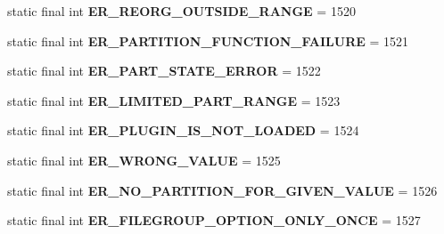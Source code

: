 \begin{DoxyCompactItemize}
static final int {\bfseries E\+R\+\_\+\+R\+E\+O\+R\+G\+\_\+\+O\+U\+T\+S\+I\+D\+E\+\_\+\+R\+A\+N\+GE} = 1520
\item 
\mbox{\label{classcom_1_1mysql_1_1jdbc_1_1_mysql_error_numbers_acfb68e0818bd6c25bb9a5c23c0c34066}} 
static final int {\bfseries E\+R\+\_\+\+P\+A\+R\+T\+I\+T\+I\+O\+N\+\_\+\+F\+U\+N\+C\+T\+I\+O\+N\+\_\+\+F\+A\+I\+L\+U\+RE} = 1521
\item 
\mbox{\label{classcom_1_1mysql_1_1jdbc_1_1_mysql_error_numbers_a9e58d22005489ba94e829c7f9d4f4b8c}} 
static final int {\bfseries E\+R\+\_\+\+P\+A\+R\+T\+\_\+\+S\+T\+A\+T\+E\+\_\+\+E\+R\+R\+OR} = 1522
\item 
\mbox{\label{classcom_1_1mysql_1_1jdbc_1_1_mysql_error_numbers_a5b07e19e49c57a0c1a8d88fe60d5ea9e}} 
static final int {\bfseries E\+R\+\_\+\+L\+I\+M\+I\+T\+E\+D\+\_\+\+P\+A\+R\+T\+\_\+\+R\+A\+N\+GE} = 1523
\item 
\mbox{\label{classcom_1_1mysql_1_1jdbc_1_1_mysql_error_numbers_af173c4a54da56553759d1473b291006b}} 
static final int {\bfseries E\+R\+\_\+\+P\+L\+U\+G\+I\+N\+\_\+\+I\+S\+\_\+\+N\+O\+T\+\_\+\+L\+O\+A\+D\+ED} = 1524
\item 
\mbox{\label{classcom_1_1mysql_1_1jdbc_1_1_mysql_error_numbers_accda4ae68101a6526db20c8fbe805400}} 
static final int {\bfseries E\+R\+\_\+\+W\+R\+O\+N\+G\+\_\+\+V\+A\+L\+UE} = 1525
\item 
\mbox{\label{classcom_1_1mysql_1_1jdbc_1_1_mysql_error_numbers_ac0c6bd7ceab1743483473ceaad360803}} 
static final int {\bfseries E\+R\+\_\+\+N\+O\+\_\+\+P\+A\+R\+T\+I\+T\+I\+O\+N\+\_\+\+F\+O\+R\+\_\+\+G\+I\+V\+E\+N\+\_\+\+V\+A\+L\+UE} = 1526
\item 
\mbox{\label{classcom_1_1mysql_1_1jdbc_1_1_mysql_error_numbers_adc4acf8419de1b23ba3b0aee8109456d}} 
static final int {\bfseries E\+R\+\_\+\+F\+I\+L\+E\+G\+R\+O\+U\+P\+\_\+\+O\+P\+T\+I\+O\+N\+\_\+\+O\+N\+L\+Y\+\_\+\+O\+N\+CE} = 1527

\end{DoxyCompactItemize}

